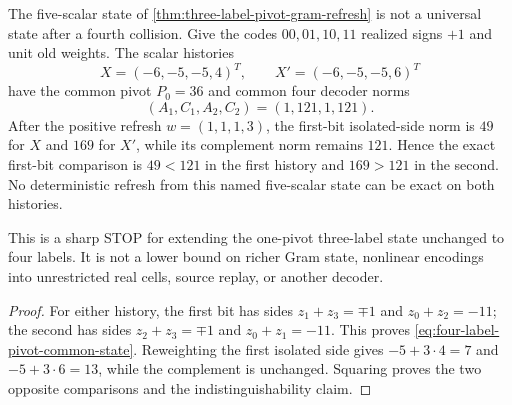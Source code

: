 \begin{proposition}
\label{prop:four-label-one-pivot-refresh-obstruction}
The five-scalar state of
\cref{thm:three-label-pivot-gram-refresh} is not a universal state after a
fourth collision.  Give the codes $00,01,10,11$ realized signs $+1$ and unit
old weights.  The scalar histories
\begin{equation}
 X=(-6,-5,-5,4)^T,
 \qquad
 X'=(-6,-5,-5,6)^T
 \label{eq:four-label-pivot-histories}
\end{equation}
have the common pivot $P_0=36$ and common four decoder norms
\begin{equation}
 (A_1,C_1,A_2,C_2)=(1,121,1,121).
 \label{eq:four-label-pivot-common-state}
\end{equation}
After the positive refresh $w=(1,1,1,3)$, the first-bit isolated-side norm is
$49$ for $X$ and $169$ for $X'$, while its complement norm remains $121$.
Hence the exact first-bit comparison is $49<121$ in the first history and
$169>121$ in the second.  No deterministic refresh from this named
five-scalar state can be exact on both histories.

This is a sharp STOP for extending the one-pivot three-label state unchanged
to four labels.  It is not a lower bound on richer Gram state, nonlinear
encodings into unrestricted real cells, source replay, or another decoder.
\end{proposition}

\begin{proof}
For either history, the first bit has sides $z_1+z_3=\mp1$ and
$z_0+z_2=-11$; the second has sides $z_2+z_3=\mp1$ and
$z_0+z_1=-11$.  This proves
\cref{eq:four-label-pivot-common-state}.  Reweighting the first isolated side
gives $-5+3\cdot4=7$ and $-5+3\cdot6=13$, while the complement is unchanged.
Squaring proves the two opposite comparisons and the indistinguishability
claim.
\end{proof}

